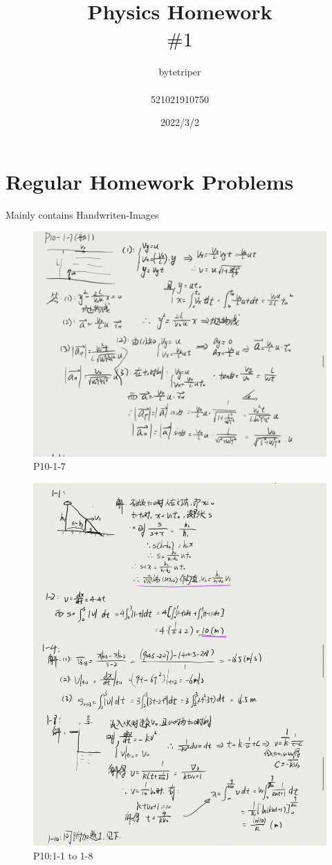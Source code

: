 \documentclass[]{article}
\title{Physics Homework\\$\#1$}
\author{bytetriper\\\\521021910750}
\date{2022/3/2}
\begin{document}
\maketitle
\tableofcontents
\newpage
\large
\section{Regular Homework Problems}
Mainly contains Handwriten-Images\\
\begin{figure}[htbp]
    \centering
    \includegraphics[width=1.3\textwidth]{1_7.jpg}
    \caption{P10-1-7}
    \label{fig:myphoto}
    \end{figure}
\begin{figure}[htbp]
    \centering
    \includegraphics[width=1.2\textwidth]{1_1.jpg}
    \caption{P10:1-1 to 1-8}
    \label{fig:myphoto}
    \end{figure}
\newpage
\end{document}
